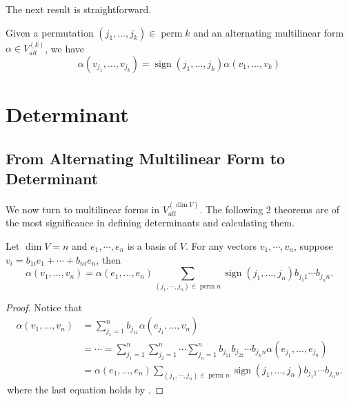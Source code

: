 The next result is straightforward.
\begin{proposition} \label{prop: gene_swapping}
Given a permutation $(j_1, \ldots, j_k) \in \operatorname{perm} k$ and an alternating multilinear form $\alpha \in V_{alt}^{(k)}$, we have
$$\alpha(v_{j_1}, \ldots, v_{j_k}) = \operatorname{sign}(j_1, \ldots, j_k) \alpha(v_1, \ldots, v_k)$$
\end{proposition}

\section{Determinant}
\subsection{From Alternating Multilinear Form to Determinant}
We now turn to multilinear forms in $V_{alt}^{(\dim V)}$. The following 2 theorems are of the most significance in defining determinants and calculating them.
\begin{theorem} 
    Let $\dim V =n$ and $e_1,\cdots,e_n$ is a basis of $V$. For any vectors $v_1,\cdots,v_n$, suppose $v_i = b_{1i}e_1 +\cdots+ b_{ni} e_n$, then 
    $$\alpha(v_1, \ldots, v_n) = \alpha(e_1, \ldots, e_n) \sum_{(j_1,\cdots, j_n) \in \operatorname{perm} n} \operatorname{sign}(j_1, \ldots, j_n) b_{j_1 1}\cdots b_{j_n n}.$$
\end{theorem}
\begin{proof}
    Notice that 
    $$\begin{aligned}
        \alpha(v_1, \ldots, v_n) &= \sum_{j_1 =1}^{n} b_{j_11} \alpha(e_{j_1}, \ldots, v_n) \\
        & = \cdots = \sum_{j_1 =1}^{n} \sum_{j_2 =1}^{n} \cdots \sum_{j_n =1}^{n} b_{j_11} b_{j_22}\cdots b_{j_nn} \alpha(e_{j_1}, \ldots, e_{j_n})\\
        & = \alpha(e_1, \ldots, e_n) \sum_{(j_1,\cdots, j_n) \in \operatorname{perm} n} \operatorname{sign}(j_1, \ldots, j_n) b_{j_1 1}\cdots b_{j_n n}.
    \end{aligned}$$
    \,where the last equation holds by .
\end{proof}

